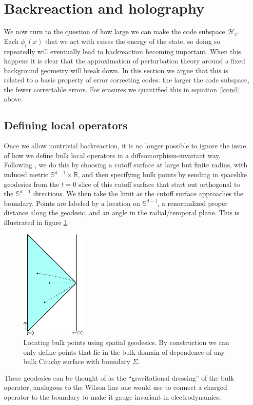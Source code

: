 \documentclass[12pt]{article}
\newcommand{\HC}{\mathcal{H}_{\mathcal{C}}}
\begin{document}
\section{Backreaction and holography}\label{backreactsec}
We now turn to the question of how large we can make the code subspace $\HC$.  Each $\phi_i(x)$ that we act with raises the energy of the state, so doing so repeatedly will eventually lead to backreaction becoming important.  When this happens it is clear that the approximation of perturbation theory around a fixed background geometry will break down.  In this section we argue that this is related to a basic property of error correcting codes: the larger the code subspace, the fewer correctable errors.  For erasures we quantified this in equation \eqref{lcond} above.  

\subsection{Defining local operators}
Once we allow nontrivial backreaction, it is no longer possible to ignore the issue of how we define bulk local operators in a diffeomorphism-invariant way.  Following \cite{Heemskerk:2012np,Kabat:2013wga}, we do this by choosing a cutoff surface at large but finite radius, with induced metric $\mathbb{S}^{d-1}\times \mathbb{R}$, and then specifying bulk points by sending in spacelike geodesics from the $t=0$ slice of this cutoff surface that start out orthogonal to the $\mathbb{S}^{d-1}$ directions.  We then take the limit as the cutoff surface approaches the boundary.  Points are labeled by a location on $\mathbb{S}^{d-1}$, a renormalized proper distance along the geodesic, and an angle in the radial/temporal plane.  This is illustrated in figure \ref{findpoints}. 
\begin{figure}
\begin{center}
\includegraphics[height=5.5cm]{findpoints.pdf}
\caption{Locating bulk points using spatial geodesics.  By construction we can only define points that lie in the bulk domain of dependence of any bulk Cauchy surface with boundary $\Sigma$.}\label{findpoints}
\end{center}
\end{figure}
These geodesics can be thought of as the ``gravitational dressing'' of the bulk operator, analogous to the Wilson line one would use to connect a charged operator to the boundary to make it gauge-invariant in electrodynamics.  
\end{document}
